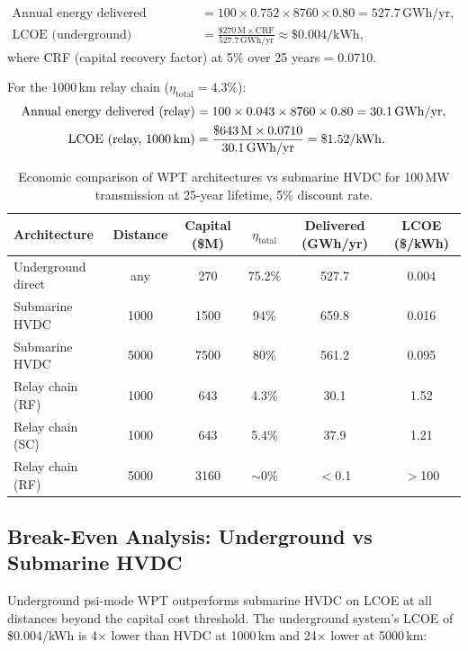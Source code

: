 \documentclass[aps,prd,twocolumn,superscriptaddress]{revtex4-2}
\begin{document}
\begin{align}
\text{Annual energy delivered (underground)} &= 100\times0.752\times8760\times0.80
= 527.7\,\mathrm{GWh/yr},
\label{eq:energy_underground}\\
\text{LCOE (underground)} &= \frac{\$270\,\mathrm{M}\times\mathrm{CRF}}{527.7\,\mathrm{GWh/yr}}
\approx \$0.004/\mathrm{kWh},
\label{eq:LCOE_underground}
\end{align}
where CRF (capital recovery factor) at 5\% over 25 years = 0.0710.

For the 1000\,km relay chain ($\eta_\mathrm{total} = 4.3\%$):
\begin{align}
\text{Annual energy delivered (relay)} &= 100\times0.043\times8760\times0.80
= 30.1\,\mathrm{GWh/yr},
\label{eq:energy_relay}\\
\text{LCOE (relay, 1000\,km)} &= \frac{\$643\,\mathrm{M}\times0.0710}{30.1\,\mathrm{GWh/yr}}
= \$1.52/\mathrm{kWh}.
\label{eq:LCOE_relay}
\end{align}

\begin{table}[H]
\centering
\caption{Economic comparison of WPT architectures vs submarine HVDC
for 100\,MW transmission at 25-year lifetime, 5\% discount rate.}
\label{tab:economics}
\begin{tabular}{lccccc}
\toprule
Architecture & Distance & Capital (\$M) & $\eta_\mathrm{total}$ &
  Delivered (GWh/yr) & LCOE (\$/kWh) \\
\midrule
Underground direct  & any    & 270   & 75.2\% & 527.7 & 0.004 \\
Submarine HVDC      & 1000   & 1500  & 94\%   & 659.8 & 0.016 \\
Submarine HVDC      & 5000   & 7500  & 80\%   & 561.2 & 0.095 \\
Relay chain (RF)    & 1000   & 643   & 4.3\%  & 30.1  & 1.52  \\
Relay chain (SC)    & 1000   & 643   & 5.4\%  & 37.9  & 1.21  \\
Relay chain (RF)    & 5000   & 3160  & $\sim$0\% & $<$0.1 & $>$100 \\
\bottomrule
\end{tabular}
\end{table}

\subsection{Break-Even Analysis: Underground vs Submarine HVDC}

Underground psi-mode WPT outperforms submarine HVDC on LCOE at all
distances beyond the capital cost threshold.  The underground system's
LCOE of \$0.004/kWh is 4$\times$ lower than HVDC at 1000\,km and
24$\times$ lower at 5000\,km:
\end{document}
